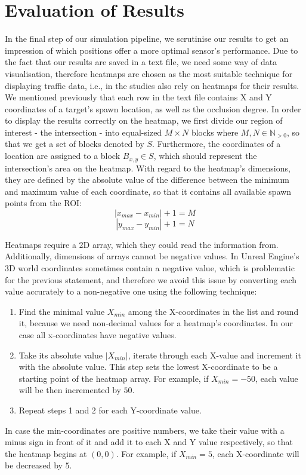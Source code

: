  \section{Evaluation of Results}
 In the final step of our simulation pipeline, we scrutinise our results to get an impression of which positions offer a more optimal sensor's performance. Due to the fact that our results are saved in a text file, we need some way of data visualisation, therefore heatmaps are chosen as the most suitable technique for displaying traffic data, i.e., in the studies \cite{heatmap_first, heatmap_second} also rely on heatmaps for their results. We mentioned previously that each row in the text file contains X and Y coordinates of a target's spawn location, as well as the occlusion degree. In order to display the results correctly on the heatmap, we first divide our region of interest - the intersection - into equal-sized $M \times N$ blocks where $M,N \in \mathbb{N}_{>0}$, so that we get a set of blocks denoted by $S$. Furthermore, the coordinates of a location are assigned to a block $B_{x,y} \in S$, which should represent the intersection's area on the heatmap. With regard to the heatmap's dimensions, they are defined by the absolute value of the difference between the minimum and maximum value of each coordinate, so that it contains all available spawn points from the ROI:
 \begin{equation}
     |x_{max} - x_{min}| + 1 = M
 \end{equation}
 \begin{equation}
     |y_{max} - y_{min}| + 1 = N
 \end{equation}
 
 Heatmaps require a 2D array, which they could read the information from. Additionally, dimensions of arrays cannot be negative values. In Unreal Engine's 3D world coordinates sometimes contain a negative value, which is problematic for the previous statement, and therefore we avoid this issue by converting each value accurately to a non-negative one using the following technique:
 \begin{enumerate}
     \item Find the minimal value $X_{min}$ among the X-coordinates in the list and round it, because we need non-decimal values for a heatmap's coordinates. In our case all x-coordinates have negative values.
     \item Take its absolute value $|X_{min}|$, iterate through each X-value and increment it with the absolute value. This step sets the lowest X-coordinate to be a starting point of the heatmap array. For example, if $X_{min} = -50$, each value will be then incremented by $50$.  
     \item Repeat steps 1 and 2 for each Y-coordinate value.
 \end{enumerate}
 In case the min-coordinates are positive numbers, we take their value with a minus sign in front of it and add it to each X and Y value respectively, so that the heatmap begins at $(0,0)$. For example, if $X_{min} = 5$, each X-coordinate will be decreased by $5$.
 
